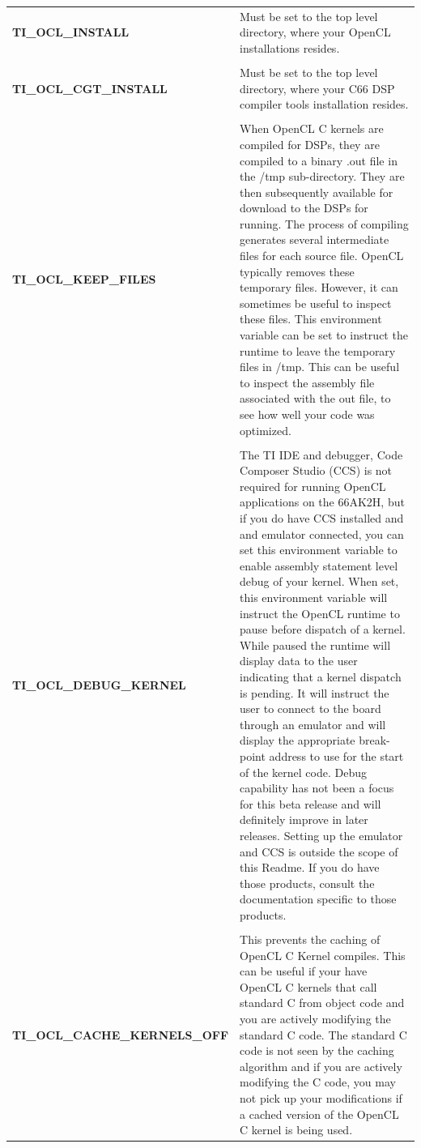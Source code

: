 \documentclass[10pt]{article}
\begin{document}
\begin{tabular}{l p{11cm} }
\textbf{TI\_OCL\_INSTALL} & 
Must be set to the top level directory, where your OpenCL installations resides.\\
\\
\textbf{TI\_OCL\_CGT\_INSTALL} & 
Must be set to the top level directory, where your C66 DSP compiler tools installation resides.\\
\\
\textbf{TI\_OCL\_KEEP\_FILES} & 
When OpenCL C kernels are compiled for DSPs, they are
compiled to a binary .out file in the /tmp sub-directory.
They are then subsequently available for download to the
DSPs for running.  The process of compiling generates
several intermediate files for each source file.  
OpenCL typically removes these temporary files.  However,
it can sometimes be useful to inspect these files.  This
environment variable can be set to instruct the runtime to
leave the temporary files in /tmp.  This can be useful to
inspect the assembly file associated with the out file, to
see how well your code was optimized.\\
\\
\textbf{TI\_OCL\_DEBUG\_KERNEL} & 
The TI IDE and debugger, Code Composer Studio (CCS) is not
required for running OpenCL applications on the 66AK2H,
but if you do have CCS installed and and emulator
connected, you can set this environment
variable to enable assembly statement level debug of your
kernel.  When set, this environment variable will instruct
the OpenCL runtime to pause before dispatch of a kernel.
While paused the runtime will display data to the user
indicating that a kernel dispatch is pending. It will
instruct the user to connect to the board through an
emulator and will display the appropriate break-point
address to use for the start of the kernel code.  Debug
capability has not been a focus for this beta release and
will definitely improve in later releases. Setting up the
emulator and CCS is outside the scope of this Readme.  If
you do have those products, consult the documentation
specific to those products.\\
\\
\textbf{TI\_OCL\_CACHE\_KERNELS\_OFF} & 
This prevents the caching of OpenCL C Kernel
compiles. This can be useful if your have OpenCL C 
kernels that call standard C from object code and you
are actively modifying the standard C code.  The
standard C code is not seen by the caching algorithm
and if you are actively modifying the C code, you
may not pick up your modifications if a cached
version of the OpenCL C kernel is being used.\\
\end{tabular}
\end{document}
